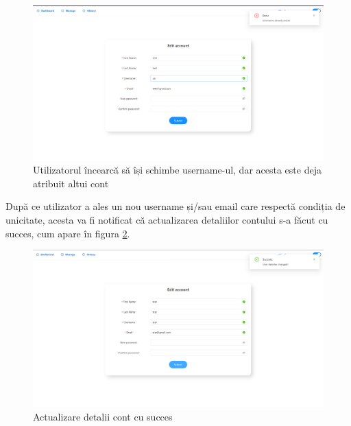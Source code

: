 \begin{figure}[H]
	\centering
	\includegraphics[width=150mm]{figs/editProfileUsername.png}
    \caption{Utilizatorul încearcă să își schimbe username-ul, dar acesta este deja atribuit altui cont}
	\label{fig:editProfileUsername}
\end{figure}

După ce utilizator a ales un nou username și/sau email care respectă condiția de unicitate, acesta va fi notificat că actualizarea detaliilor contului s-a făcut cu succes, cum apare în figura \ref{fig:editProfile}.
\begin{figure}[H]
	\centering
	\includegraphics[width=150mm]{figs/editProfile.png}
    \caption{Actualizare detalii cont cu succes}
	\label{fig:editProfile}
\end{figure}

